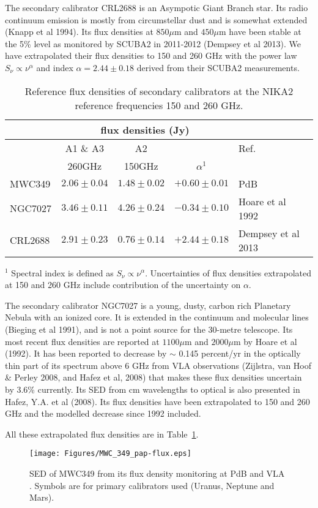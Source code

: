 The secondary calibrator CRL2688 is an Asympotic Giant Branch star. Its radio continuum emission is mostly
from circumstellar dust and is somewhat extended  (Knapp et al 1994).
Its flux densities at $850\mu$m  and $450\mu$m  have been stable at the 5\% level as monitored by SCUBA2 in 2011-2012
(Dempsey et al 2013). We have extrapolated their flux densities to  150 and 260 GHz
with the power law $S_{\nu} \propto \nu^{\alpha}$ and index $\alpha=2.44\pm0.18$ derived from their SCUBA2 measurements.

\begin{table}[h]
\caption[]{Reference flux densities of secondary calibrators at the NIKA2 reference frequencies 150 and 260 GHz.}
\begin{tabular}{|l|c|c|c|l|}
\hline
\multicolumn{1}{|c}{}  & \multicolumn{3}{|c}{flux  densities (Jy)} & \multicolumn{1}{|c|}{}  \\
\hline
         &    A1 \& A3       &  A2             &          &   Ref. \\
         &  260GHz           &  150GHz         & $\alpha^1$ &      \\
\hline
MWC349   &   $2.06\pm0.04$  &  $1.48\pm0.02$ &  $+0.60\pm0.01$      &  PdB \cite{krips}    \\
NGC7027  &   $3.46\pm0.11$   &  $4.26\pm0.24$  &  $-0.34\pm0.10$     &  Hoare et al 1992       \\
CRL2688  &   $2.91\pm0.23$   &  $0.76\pm0.14$  &  $+2.44\pm0.18$     &  Dempsey et al 2013  \\
\hline
\end{tabular}
{\scriptsize $^1$ Spectral index is defined as $S_{\nu} \propto \nu^{\alpha}$. Uncertainties of flux densities extrapolated
at 150 and 260 GHz include contribution of the uncertainty on $\alpha$.}
\label{tab:flux_ref_sec}
\end{table}

The secondary calibrator NGC7027 is a young, dusty, carbon rich Planetary Nebula with an ionized core.
It is extended in the continuum and molecular lines (Bieging et al 1991), and  is not a point source
for the 30-metre telescope.
Its  most recent flux densities are reported at $1100\mu$m  and $2000\mu$m by Hoare et al (1992). It has been reported
to decrease by $\sim$ 0.145 percent/yr in the optically thin part of its spectrum above  $6$ GHz from VLA
observations (Zijlstra, van Hoof \& Perley 2008, and Hafez et al, 2008) that makes these flux densities uncertain
by 3.6\% currently. Its SED from cm wavelengths to optical is also presented in Hafez, Y.A. et al (2008).
Its flux densities have been extrapolated to 150 and 260 GHz and the modelled decrease since 1992 included.

All these extrapolated flux densities are in Table~\ref{tab:flux_ref_sec}.

\begin{figure}[h]
\begin{center}
  \texttt{[image: Figures/MWC\_349\_pap-flux.eps]}
  \caption{SED of MWC349 from its flux density monitoring at PdB and VLA \cite{krips}.
  Symbols are for primary calibrators used (Uranus, Neptune and Mars).}
\label{fig:Krips2017}
\end{center}
\end{figure}
